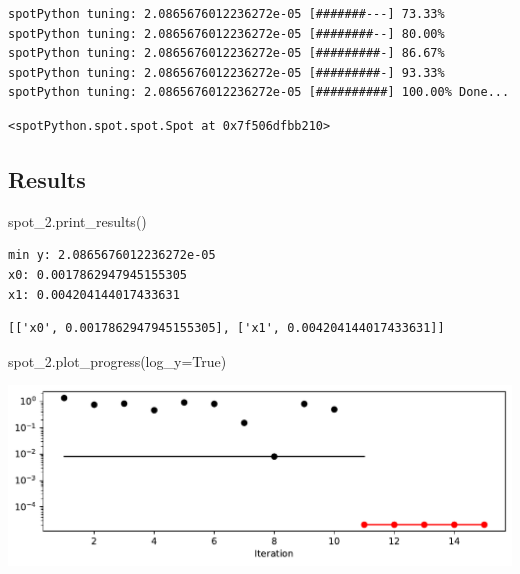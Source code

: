 \documentclass[
  letterpaper,
  DIV=11,
  numbers=noendperiod]{scrreprt}
\newenvironment{Shaded}{\begin{snugshade}}{\end{snugshade}}
\newcommand{\NormalTok}[1]{\textcolor[rgb]{0.00,0.23,0.31}{#1}}
\newcommand{\OperatorTok}[1]{\textcolor[rgb]{0.37,0.37,0.37}{#1}}
\newcommand{\VariableTok}[1]{\textcolor[rgb]{0.07,0.07,0.07}{#1}}
\begin{document}
\begin{verbatim}
spotPython tuning: 2.0865676012236272e-05 [#######---] 73.33% 
spotPython tuning: 2.0865676012236272e-05 [########--] 80.00% 
spotPython tuning: 2.0865676012236272e-05 [#########-] 86.67% 
spotPython tuning: 2.0865676012236272e-05 [#########-] 93.33% 
spotPython tuning: 2.0865676012236272e-05 [##########] 100.00% Done...
\end{verbatim}

\begin{verbatim}
<spotPython.spot.spot.Spot at 0x7f506dfbb210>
\end{verbatim}

\subsection{Results}\label{results-2}

\begin{Shaded}
\begin{Highlighting}[]
\NormalTok{spot\_2.print\_results()}
\end{Highlighting}
\end{Shaded}

\begin{verbatim}
min y: 2.0865676012236272e-05
x0: 0.0017862947945155305
x1: 0.004204144017433631
\end{verbatim}

\begin{verbatim}
[['x0', 0.0017862947945155305], ['x1', 0.004204144017433631]]
\end{verbatim}

\begin{Shaded}
\begin{Highlighting}[]
\NormalTok{spot\_2.plot\_progress(log\_y}\OperatorTok{=}\VariableTok{True}\NormalTok{)}
\end{Highlighting}
\end{Shaded}

\includegraphics{009_num_spot_anisotropic_files/figure-pdf/cell-7-output-1.pdf}
\end{document}
